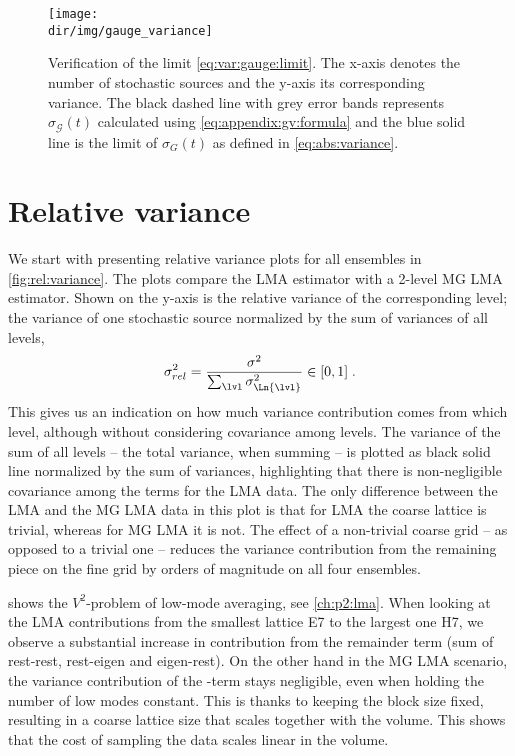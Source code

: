 \begin{figure}
\centering
\texttt{[image: \\dir/img/gauge\_variance]}
\caption{
Verification of the limit \cref{eq:var:gauge:limit}.
The x-axis denotes the number of stochastic sources and the y-axis its corresponding variance.
The black dashed line with grey error bands represents $\sigma_{\mathcal{G}}(t)$ calculated using \cref{eq:appendix:gv:formula} and the blue solid line is the limit of $\sigma_{G}(t)$ as defined in \cref{eq:abs:variance}.
\takenfull
}
\label{fig:gauge:variance}
\end{figure}

\section{Relative variance}
\label{sec:numerics:rel:variance}

We start with presenting relative variance plots for all ensembles in \cref{fig:rel:variance}.
The plots compare the LMA estimator with a 2-level MG LMA estimator.
Shown on the y-axis is the relative variance of the corresponding level; the variance of one stochastic source normalized by the sum of variances of all levels, \ie
\begin{equation} \label{eq:rel:variance}
\sigma_{rel}^{2} = \frac{\sigma^{2}}{ \sum_{\lvl} \sigma_{\Ln{\lvl}}^{2} } \in [0, 1] \;.
\end{equation}
This gives us an indication on how much variance contribution comes from which level, although without considering covariance among levels.
The variance of the sum of all levels -- the total variance, when summing -- is plotted as black solid line normalized by the sum of variances, highlighting that there is non-negligible covariance among the terms for the LMA data.
The only difference between the LMA and the MG LMA data in this plot is that for LMA the  coarse lattice is trivial, whereas for MG LMA it is not.
The effect of a non-trivial coarse grid -- as opposed to a trivial one -- reduces the variance contribution from the remaining piece on the fine grid by orders of magnitude on all four ensembles.

 shows the $V^{2}$-problem of low-mode averaging, see \cref{ch:p2:lma}.
When looking at the LMA contributions from the smallest lattice E7 to the largest one H7, we observe a substantial increase in contribution from the remainder term (sum of rest-rest, rest-eigen and eigen-rest).
On the other hand in the MG LMA scenario, the variance contribution of the -term stays negligible, even when holding the number of low modes constant.
This is thanks to keeping the block size fixed, resulting in a coarse lattice size that scales together with the volume.
This shows that the cost of sampling the data scales linear in the volume.


